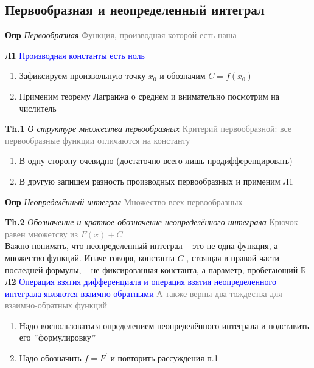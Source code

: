 \subsection{Первообразная и неопределенный интеграл}

\textbf{Опр} \textit{Первообразная} \textcolor{gray}{Функция, производная которой есть наша}

\textbf{Л1} \textcolor{blue}{Производная константы есть ноль}

\begin{enumerate}
    \item Зафиксируем произвольную точку $x_0$ и обозначим $C = f(x_0)$
    \item Применим теорему Лагранжа о среднем и внимательно посмотрим на числитель
\end{enumerate}

\textbf{Th.1} \textit{О структуре множества первообразных} \textcolor{gray}{Критерий первообразной: все
первообразные функции отличаются на константу}

\begin{enumerate}
    \item В одну сторону очевидно (достаточно всего лишь продифференцировать)
    \item В другую запишем разность производных первообразных и применим Л1
\end{enumerate}

\textbf{Опр} \textit{Неопределённый интеграл} \textcolor{gray}{Множество всех первообразных}

\textbf{Th.2} \textit{Обозначение и краткое обозначение неопределённого интеграла} \textcolor{gray}{Крючок равен
множетсву из $F(x) + C$} \\

Важно понимать, что неопределенный интеграл – это не одна функция, а множество функций.
Иначе говоря, константа $C$ , стоящая в правой части последней формулы, – не фиксированная константа, а параметр,
пробегающий $\mathbb{R}$ \\

\textbf{Л2} \textcolor{blue}{Операция взятия дифференциала и операция взятия неопределенного интеграла являются
взаимно обратными} \textcolor{gray}{А также верны два тождества для взаимно-обратных функций}

\begin{enumerate}
    \item Надо воспользоваться определением неопределённого интеграла и подставить его \("\)формулировку\("\)
    \item Надо обозначить $f = F^{'}$ и повторить рассуждения п.1
\end{enumerate}

